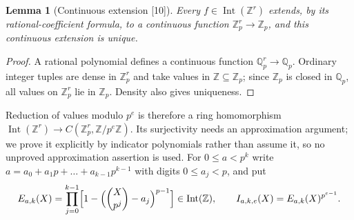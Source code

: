 \documentclass[11pt,letterpaper]{article}
\numberwithin{equation}{section}
\newtheorem{lemma}[lemma]{Lemma}
\theoremstyle{definition}
\theoremstyle{remark}
\theoremstyle{plain}
\newcommand{\Z}{\mathbb Z}
\newcommand{\Q}{\mathbb Q}
\newcommand{\Int}{\operatorname{Int}}
\newcommand{\src}[1]{\textup{\textsf{[#1]}}}
\begin{document}
\begin{lemma}[Continuous extension \src{10}]\label{osq:pm:lem:padicext}
Every $f\in\Int(\Z^r)$ extends, by its rational-coefficient formula, to a continuous
function $\Z_p^r\to\Z_p$, and this continuous extension is unique.
\end{lemma}
\begin{proof}
A rational polynomial defines a continuous function $\Q_p^r\to\Q_p$. Ordinary integer
tuples are dense in $\Z_p^r$ and take values in $\Z\subseteq\Z_p$; since $\Z_p$ is closed
in $\Q_p$, all values on $\Z_p^r$ lie in $\Z_p$. Density also gives uniqueness.
\end{proof}

Reduction of values modulo $p^e$ is therefore a ring homomorphism
$\Int(\Z^r)\to C(\Z_p^r,\Z/p^e\Z)$. Its surjectivity needs an approximation argument; we
prove it explicitly by indicator polynomials rather than assume it, so no unproved
approximation assertion is used. For $0\le a<p^k$ write $a=a_0+a_1p+\dots+a_{k-1}p^{k-1}$
with digits $0\le a_j<p$, and put
\begin{equation}\label{osq:pm:eq:indicator}
 E_{a,k}(X)=\prod_{j=0}^{k-1}\Bigl[1-\Bigl(\binom X{p^j}-a_j\Bigr)^{p-1}\Bigr]
 \in\Int(\Z),
 \qquad
 I_{a,k,e}(X)=E_{a,k}(X)^{p^{e-1}}.
\end{equation}
\end{document}
